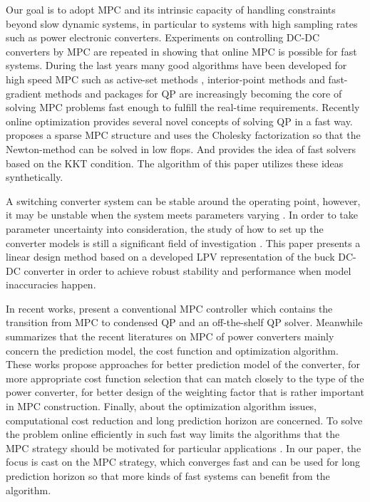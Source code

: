 \documentclass[journal]{IEEEtran}
\begin{document}
Our goal is to adopt MPC and its intrinsic capacity of handling constraints beyond slow dynamic systems, in particular to systems with high sampling rates such as power electronic converters. Experiments on controlling DC-DC converters by MPC are repeated in \cite{geyer2008hybrid} showing that online MPC is possible for fast systems. During the last years many good algorithms have been developed for high speed MPC such as active-set methods \cite{ferreau2008online}, interior-point methods \cite{mattingley2012cvxgen} and fast-gradient methods \cite{richter2009real} and packages for QP are increasingly becoming the core of solving MPC problems fast enough to fulfill the real-time requirements. Recently online optimization provides several novel concepts of solving QP in a fast way. \cite{wang2010fast} proposes a sparse MPC structure and uses the Cholesky factorization so that the Newton-method can be solved  in low flops. And \cite{richter2012computational} provides the idea of fast solvers based on the KKT condition. The algorithm of this paper utilizes these ideas synthetically.

A switching converter system can be stable around the operating point, however, it may be unstable when the system meets parameters varying \cite{vlad2014advanced} \cite{olalla2012robust}. In order to take parameter uncertainty into consideration, the study of how to set up the converter models is still a significant field of investigation \cite{olalla2009robust}. This paper presents a linear design method based on a developed LPV representation of the buck DC-DC converter \cite{thabet2016set} in order to achieve robust stability and performance when model inaccuracies happen.

In recent works, \cite{dehghanzadeh2018model,kumar2014comparison,gaouzi2017constrained} present a conventional MPC controller which contains the transition from MPC to condensed QP and an off-the-shelf QP solver. Meanwhile \cite{vazquez2017model} summarizes that the recent literatures on MPC of power converters mainly concern the prediction model, the cost function and optimization algorithm. These works propose approaches for better prediction model of the converter, for more appropriate cost function selection that can match closely to the type of the power converter, for better design of the weighting factor that is rather important in MPC construction. Finally, about the optimization algorithm issues, computational cost reduction and long prediction horizon are concerned. To solve the problem online efficiently in such fast way limits the algorithms that the MPC strategy should be motivated for particular applications \cite{vazquez2014model}. In our paper, the focus is cast on the MPC strategy, which converges fast and can be used for long prediction horizon so that more kinds of fast systems can benefit from the algorithm.
\end{document}
